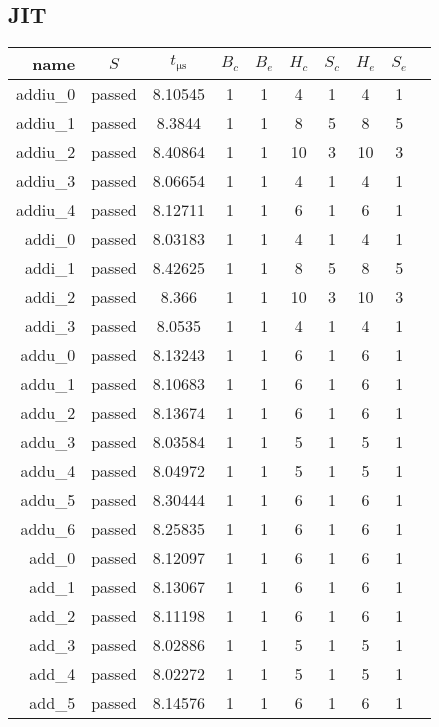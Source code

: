 \subsection{JIT}
\begin{longtable}{r|ccccccccc}
    \toprule
    name & $S$ & $t_{\si{\micro\second}}$ & $B_c$ & $B_e$ & $H_c$ & $S_c$ & $H_e$ & $S_e$ \\
    \midrule
    \endhead

    addiu\_0 & passed & 8.10545 & 1 & 1 & 4 & 1 & 4 & 1 \\
    addiu\_1 & passed & 8.3844 & 1 & 1 & 8 & 5 & 8 & 5 \\
    addiu\_2 & passed & 8.40864 & 1 & 1 & 10 & 3 & 10 & 3 \\
    addiu\_3 & passed & 8.06654 & 1 & 1 & 4 & 1 & 4 & 1 \\
    addiu\_4 & passed & 8.12711 & 1 & 1 & 6 & 1 & 6 & 1 \\
    addi\_0 & passed & 8.03183 & 1 & 1 & 4 & 1 & 4 & 1 \\
    addi\_1 & passed & 8.42625 & 1 & 1 & 8 & 5 & 8 & 5 \\
    addi\_2 & passed & 8.366 & 1 & 1 & 10 & 3 & 10 & 3 \\
    addi\_3 & passed & 8.0535 & 1 & 1 & 4 & 1 & 4 & 1 \\
    addu\_0 & passed & 8.13243 & 1 & 1 & 6 & 1 & 6 & 1 \\
    addu\_1 & passed & 8.10683 & 1 & 1 & 6 & 1 & 6 & 1 \\
    addu\_2 & passed & 8.13674 & 1 & 1 & 6 & 1 & 6 & 1 \\
    addu\_3 & passed & 8.03584 & 1 & 1 & 5 & 1 & 5 & 1 \\
    addu\_4 & passed & 8.04972 & 1 & 1 & 5 & 1 & 5 & 1 \\
    addu\_5 & passed & 8.30444 & 1 & 1 & 6 & 1 & 6 & 1 \\
    addu\_6 & passed & 8.25835 & 1 & 1 & 6 & 1 & 6 & 1 \\
    add\_0 & passed & 8.12097 & 1 & 1 & 6 & 1 & 6 & 1 \\
    add\_1 & passed & 8.13067 & 1 & 1 & 6 & 1 & 6 & 1 \\
    add\_2 & passed & 8.11198 & 1 & 1 & 6 & 1 & 6 & 1 \\
    add\_3 & passed & 8.02886 & 1 & 1 & 5 & 1 & 5 & 1 \\
    add\_4 & passed & 8.02272 & 1 & 1 & 5 & 1 & 5 & 1 \\
    add\_5 & passed & 8.14576 & 1 & 1 & 6 & 1 & 6 & 1 \\

\end{longtable}
